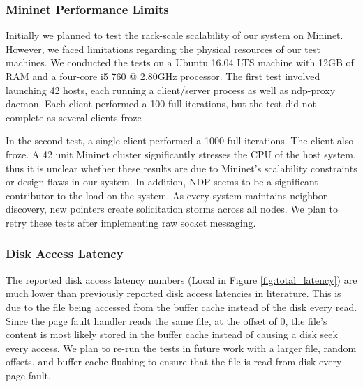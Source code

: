 \subsubsection{Mininet Performance Limits}
Initially we planned to test the rack-scale scalability of our system on Mininet. However, we faced limitations regarding the physical resources of our test machines. We conducted the tests on a Ubuntu 16.04 LTS machine with 12GB of RAM and a four-core i5 760 @ 2.80GHz processor. The first test involved launching 42 hosts, each running a client/server process as well as ndp-proxy daemon. Each client performed a 100 full iterations, but the test did not complete as several clients froze

In the second test, a single client performed a 1000 full iterations. The client also froze. 
A 42 unit Mininet cluster significantly stresses the CPU of the host system, thus it is unclear whether these results are due to Mininet's scalability constraints or design flaws in our system.
In addition, NDP seems to be a significant contributor to the load on the system. As every system maintains neighbor discovery, new pointers create solicitation storms across all nodes.
We plan to retry these tests after implementing raw socket messaging.

\subsubsection{Disk Access Latency} The reported disk access latency numbers (Local in Figure \ref{fig:total_latency}) are much lower than previously reported disk access latencies in literature. This is due to the file being accessed from the buffer cache instead of the disk every read. Since the page fault handler reads the same file, at the offset of 0, the file's content is most likely stored in the buffer cache instead of causing a disk seek every access. We plan to re-run the tests in future work with a larger file, random offsets, and buffer cache flushing to ensure that the file is read from disk every page fault.
